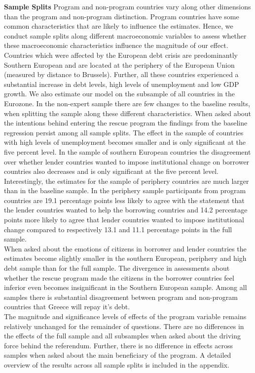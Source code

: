 \textbf{Sample Splits}
Program and non-program countries vary along other dimensions than the program and non-program distinction. Program countries have some common characteristics that are likely to influence the estimates. Hence, we conduct sample splits along different macroeconomic variables to assess whether these macroeconomic characteristics influence the magnitude of our effect. Countries which were affected by the European debt crisis are predominantly Southern European and are located at the periphery of the European Union (measured by distance to Brussels). Further, all these countries experienced a substantial increase in debt levels, high levels of unemployment and low GDP growth. We also estimate our model on the subsample of all countries in the Eurozone. In the non-expert sample there are few changes to the baseline results, when splitting the sample along these different characteristics. When asked about the intentions behind entering the rescue program the findings from the baseline regression persist among all sample splits. The effect in the sample of countries with high levels of unemployment becomes smaller and is only significant at the five percent level. In the sample of southern European countries the disagreement over whether lender countries wanted to impose institutional change on borrower countries also decreases and is only significant at the five percent level. Interestingly, the estimates for the sample of periphery countries are much larger than in the baseline sample. In the periphery sample participants from program countries are 19.1 percentage points less likely to agree with the statement that the lender countries wanted to help the borrowing countries and 14.2 percentage points more likely to agree that lender countries wanted to impose institutional change compared to respectively 13.1 and 11.1 percentage points in the full sample.\\
When asked about the emotions of citizens in borrower and lender countries the estimates become slightly smaller in the southern European, periphery and high debt sample than for the full sample. The divergence in assessments about whether the rescue program made the citizens in the borrower countries feel inferior even becomes insignificant in the Southern European sample. Among all samples there is substantial disagreement between program and non-program countries that Greece will repay it's debt. 
\\
The magnitude and significance levels of effects of the program variable remains relatively unchanged for the remainder of questions. There are no differences in the effects of the full sample and all subsamples when asked about the driving force behind the referendum. Further, there is no difference in effects across samples when asked about the main beneficiary of the program. A detailed overview of the results across all sample splits is included in the appendix. 